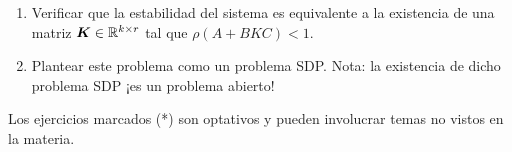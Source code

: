 \documentclass[11pt]{article}
\begin{document}
\begin{enumerate}[resume]
\begin{enumerate}
\item Verificar que la estabilidad del sistema es equivalente a la existencia de una matriz $\bm{K} \in \mathbb{R}^{k \times r}$ tal que $\rho(A + BKC ) < 1$.
\item Plantear este problema como un problema SDP. Nota: la existencia de dicho problema SDP ¡es un problema abierto!
\end{enumerate}
\end{enumerate}





Los ejercicios marcados (*) son optativos y pueden involucrar temas no vistos en la materia.
\end{document}
